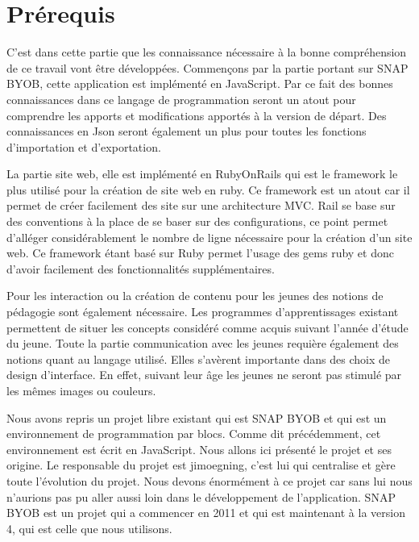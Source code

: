 \section{Prérequis}
C'est dans cette partie que les connaissance nécessaire à la bonne compréhension de ce travail vont être développées. Commençons par la partie portant sur SNAP BYOB, cette application est implémenté en JavaScript. Par ce fait des bonnes connaissances dans ce langage de programmation seront un atout pour comprendre les apports et modifications apportés à la version de départ. Des connaissances en Json seront également un plus pour toutes les fonctions d'importation et d'exportation.

La partie site web, elle est implémenté en RubyOnRails qui est le framework le plus utilisé pour la création de site web en ruby. Ce framework est un atout car il permet de créer facilement des site sur une architecture MVC. Rail se base sur des conventions à la place de se baser sur des configurations, ce point permet d'alléger considérablement le nombre de ligne nécessaire pour la création d'un site web. Ce framework étant basé sur Ruby permet l'usage des gems ruby et donc d'avoir facilement des fonctionnalités supplémentaires.

Pour les interaction ou la création de contenu pour les jeunes des notions de pédagogie sont également nécessaire. Les programmes d'apprentissages existant permettent de situer les concepts considéré comme acquis suivant l'année d'étude du jeune. Toute la partie communication avec les jeunes requière également des notions quant au langage utilisé. Elles s'avèrent importante dans des choix de design d'interface. En effet, suivant leur âge les jeunes ne seront pas stimulé par les mêmes images ou couleurs.

Nous avons repris un projet libre existant qui est SNAP BYOB et qui est un environnement de programmation par blocs. Comme dit précédemment, cet environnement est écrit en JavaScript. Nous allons ici présenté le projet et ses origine. Le responsable du projet est jimoegning, c'est lui qui centralise et gère toute l'évolution du projet. Nous devons énormément à ce projet car sans lui nous n'aurions pas pu aller aussi loin dans le développement de l'application. SNAP BYOB est un projet qui a commencer en 2011 et qui est maintenant à la version 4, qui est celle que nous utilisons.
